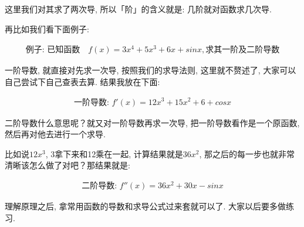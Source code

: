 这里我们对其求了两次导, 所以「阶」的含义就是: 几阶就对函数求几次导. 

再比如我们看下面例子: 

\begin{align*}
  \mbox{例子: 已知函数} \quad f(x) = 3x^4 + 5x^3 + 6x + sinx, \mbox{求其一阶及二阶导数}
\end{align*}

一阶导数, 就直接对先求一次导, 按照我们的求导法则, 这里就不赘述了, 大家可以自己尝试下自己查表去算. 结果我放在下面: 

\begin{align*}
  \mbox{一阶导数: }f'(x) = 12x^3 + 15x^2 + 6 + cosx
\end{align*}

二阶导数什么意思呢？就又对一阶导数再求一次导, 把一阶导数看作是一个原函数, 然后再对他去进行一个求导. 

比如说$12x^3$, 3拿下来和12乘在一起, 计算结果就是$36x^2$, 那之后的每一步也就非常清晰该怎么做了对吧？那结果就是: 

\begin{align*}
  \mbox{二阶导数: } f''(x) = 36x^2 + 30x - sinx
\end{align*}

理解原理之后, 拿常用函数的导数和求导公式过来套就可以了. 大家以后要多做练习. 
